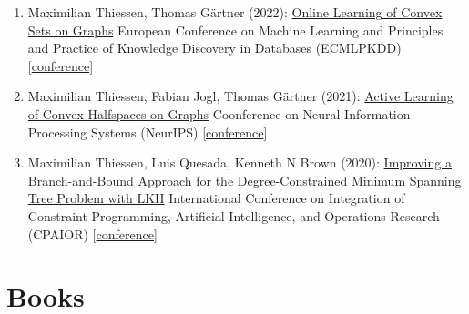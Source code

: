 \documentclass{scrartcl}
\begin{document}
\begin{enumerate}
Coonference on Neural Information Processing Systems (NeurIPS)\newline
{\footnotesize
[\href{https://pwelke.github.io/}{conference}]
}
\item
\label{thiessen2022Online}
Maximilian Thiessen, Thomas Gärtner (2022):\newline
\href{https://pwelke.github.io/}{Online Learning of Convex Sets on Graphs}\newline
European Conference on Machine Learning and Principles and Practice of Knowledge Discovery in Databases (ECMLPKDD)\newline
{\footnotesize
[\href{https://2022.ecmlpkdd.org/}{conference}]
}
\item
\label{thiessen2021active}
Maximilian Thiessen, Fabian Jogl, Thomas Gärtner (2021):\newline
\href{https://pwelke.github.io/}{Active Learning of Convex Halfspaces on Graphs}\newline
Coonference on Neural Information Processing Systems (NeurIPS)\newline
{\footnotesize
[\href{https://pwelke.github.io/}{conference}]
}
\item
\label{thiessen2020improving}
Maximilian Thiessen, Luis Quesada, Kenneth N Brown (2020):\newline
\href{https://pwelke.github.io/}{Improving a Branch-and-Bound Approach for the Degree-Constrained Minimum Spanning Tree Problem with LKH}\newline
International Conference on Integration of Constraint Programming, Artificial Intelligence, and Operations Research (CPAIOR)\newline
{\footnotesize
[\href{https://cpaior2020.dbai.tuwien.ac.at/}{conference}]
}
\seti
\end{enumerate}

\section{Books}
\begin{enumerate}
\conti
\makeatletter\let\@noitemerr\relax\makeatother
\seti
\end{enumerate}
\end{document}
